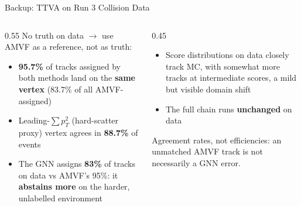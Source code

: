 \documentclass[xcolor=table,aspectratio=169]{beamer}
\begin{document}
\begin{frame}{Backup: TTVA on Run 3 Collision Data}
    \begin{columns}[t]
        \begin{column}{0.55\linewidth}
            No truth on data \(\to\) use AMVF as a reference, not as truth:
            \begin{itemize}
                \setlength\itemsep{0.5em}
                \item \textbf{95.7\%} of tracks assigned by both methods land on the \textbf{same vertex} (83.7\% of all AMVF-assigned)
                \item Leading-\(\sum p_T^2\) (hard-scatter proxy) vertex agrees in \textbf{88.7\%} of events
                \item The GNN assigns \textbf{83\%} of tracks on data vs AMVF's 95\%: it \textbf{abstains more} on the harder, unlabelled environment
            \end{itemize}
        \end{column}
        \begin{column}{0.45\linewidth}
            \begin{itemize}
                \setlength\itemsep{0.5em}
                \item Score distributions on data closely track MC, with somewhat more tracks at intermediate scores, a mild but visible domain shift
                \item The full chain runs \textbf{unchanged} on data
            \end{itemize}
            \vspace{0.4em}
            {\footnotesize\textcolor{black!55}{Agreement rates, not efficiencies: an unmatched AMVF track is not necessarily a GNN error.}}
        \end{column}
    \end{columns}
\end{frame}
\end{document}
